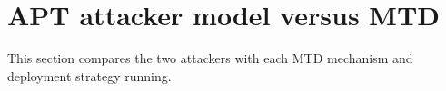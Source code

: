 \documentclass{cshonours}
\newcommand{\prelim}[1]{#1}
\begin{document}
\section{APT attacker model versus MTD}
\label{sec:effectiveness}

This section compares the two attackers with each MTD mechanism and deployment
strategy running.
\end{document}
